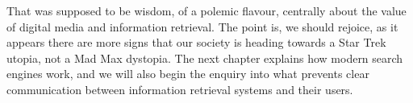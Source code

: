 




That was supposed to be wisdom, of a polemic flavour, centrally about the value of digital media and information retrieval. The point is, we should rejoice, as it appears there are more signs that our society is heading towards a Star Trek utopia, not a Mad Max dystopia. The next chapter explains how modern search engines work, and we will also begin the enquiry into what prevents clear communication between information retrieval systems and their users.
